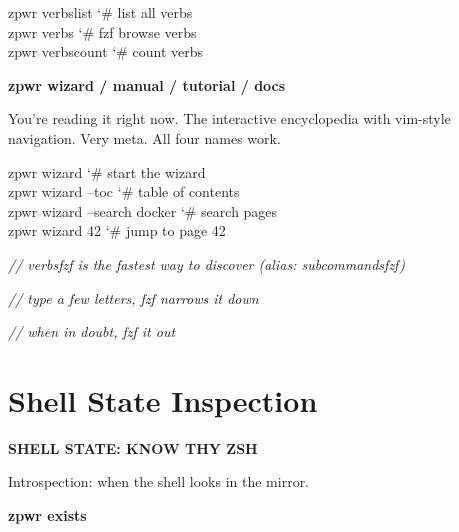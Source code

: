 \documentclass[11pt,a4paper,twoside]{book}
\begin{document}
\begin{codebox}
\color{neongreen}zpwr verbslist              {\char`\#} list all verbs\\
\color{neongreen}zpwr verbs               {\char`\#} fzf browse verbs\\
\color{neongreen}zpwr verbscount             {\char`\#} count verbs\\
\end{codebox}


\vspace{12pt}
{\bfseries\color{neonyellow} zpwr wizard / manual / tutorial / docs}\vspace{4pt}

You're reading it right now. The interactive encyclopedia with vim-style navigation. Very meta. All four names work.

\begin{codebox}
\color{neongreen}zpwr wizard                 {\char`\#} start the wizard\\
\color{neongreen}zpwr wizard --toc           {\char`\#} table of contents\\
\color{neongreen}zpwr wizard --search docker  {\char`\#} search pages\\
\color{neongreen}zpwr wizard 42              {\char`\#} jump to page 42\\
\end{codebox}

{\small\itshape\color{dimtext} // verbsfzf is the fastest way to discover (alias: subcommandsfzf)}

{\small\itshape\color{dimtext} // type a few letters, fzf narrows it down}

{\small\itshape\color{dimtext} // when in doubt, fzf it out}


\vspace{16pt}

\section{Shell State Inspection}


\vspace{10pt}
{\large\bfseries\color{neoncyan} SHELL STATE: KNOW THY ZSH}\vspace{6pt}

Introspection: when the shell looks in the mirror.


\vspace{12pt}
{\bfseries\color{neonyellow} zpwr exists}\vspace{4pt}
\end{document}
